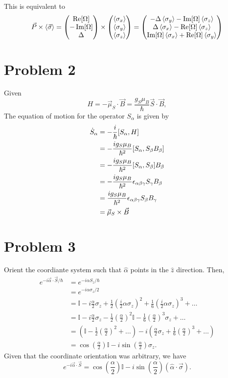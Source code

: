 \documentclass[12pt]{article}
\begin{document}
This is equivalent to
\[ \vec{P}\times\ev{\vec{\sigma}} = \mqty(\Re[\Omega]\\-\Im[\Omega]\\\Delta)\times\mqty(\ev{\sigma_x}\\\ev{\sigma_y}\\\ev{\sigma_z}) = \mqty(-\Delta\ev{\sigma_y} - \Im[\Omega]\ev{\sigma_z}\\\Delta\ev{\sigma_x}-\Re[\Omega]\ev{\sigma_z}\\\Im[\Omega]\ev{\sigma_x}+\Re[\Omega]\ev{\sigma_y}) \]

\section*{Problem 2}
Given
\[ H = -\vec{\mu}_S\cdot\vec{B} = \frac{g_S\mu_B}{\hbar}\vec{S}\cdot\vec{B}, \]
The equation of motion for the operator $S_\alpha$ is given by
\begin{align*}
    \dot{S}_\alpha &= -\frac{i}{\hbar}\comm{S_\alpha}{H} \\
    &= -\frac{ig_S\mu_B}{\hbar^2}\comm{S_\alpha}{S_\beta B_\beta} \\
    &= -\frac{ig_S\mu_B}{\hbar^2}\comm{S_\alpha}{S_\beta}B_\beta \\
    &= -\frac{ig_S\mu_B}{\hbar^2}\epsilon_{\alpha\beta\gamma}S_\gamma B_\beta \\
    &= \frac{ig_S\mu_B}{\hbar^2}\epsilon_{\alpha\beta\gamma}S_\beta B_\gamma \\
    &= \vec{\mu}_S\times\vec{B}
\end{align*}


\section*{Problem 3}
Orient the coordiante system such that $\hat{\alpha}$ points in the $\hat{z}$ direction. Then,
\begin{align*}
    e^{-i\vec{\alpha}\cdot\vec{S}/\hbar} &= e^{-i\alpha S_z/\hbar} \\
    &= e^{-i\alpha\sigma_z / 2} \\
    &= \mathbb{I} - i\frac{\alpha}{2}\sigma_z + \frac{1}{2}\left(\frac{i}{2}\alpha\sigma_z\right)^2 + \frac{1}{6}\left(\frac{i}{2}\alpha\sigma_z\right)^3 + \dots \\
    &= \mathbb{I} - i\frac{\alpha}{2}\sigma_z - \frac{1}{2}\left(\frac{\alpha}{2}\right)^2\mathbb{I} - \frac{1}{6}\left(\frac{\alpha}{2}\right)^3\sigma_z + \dots \\
    &= \left(\mathbb{I} - \frac{1}{2}\left(\frac{\alpha}{2}\right)^2 + \dots\right) - i\left(\frac{\alpha}{2}\sigma_z + \frac{1}{6}\left(\frac{\alpha}{2}\right)^3 + \dots\right) \\
    &= \cos(\frac{\alpha}{2})\mathbb{I} - i\sin(\frac{\alpha}{2})\sigma_z.
\end{align*}
Given that the coordinate orientation was arbitrary, we have
\[ e^{-i\vec{\alpha}\cdot\vec{S}} = \cos(\frac{\alpha}{2})\mathbb{I} - i\sin(\frac{\alpha}{2})\left(\hat{\alpha}\cdot\vec{\sigma}\right). \]
\end{document}
